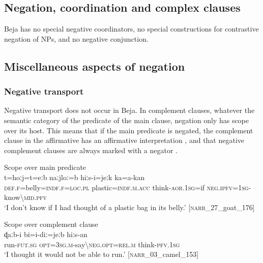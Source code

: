 \documentclass[output=paper,colorlinks,citecolor=brown]{langscibook}
\begin{document}

\subsection{Negation, coordination and complex clauses}
Beja has no special negative coordinators, no special constructions for contrastive negation of NPs, and no negative conjunction. 

\subsection{Miscellaneous aspects of negation}

\subsubsection{Negative transport}

Negative transport does not occur in Beja. In complement clauses, whatever the semantic category of the predicate of the main clause, negation only has scope over its host. This means that if the main predicate is negated, the complement clause in the affirmative has an affirmative interpretation , and that negative complement clauses are always marked with a negator .

\ea\label{ex:beja:42}
{Scope over main predicate}\\
    \gll t=hoːj=t=eːb naːjloː=b hiːs-i=jeːk ka=a-kan\\
         \textsc{def.f}=belly=\textsc{indf.f=loc.pl} plastic=\textsc{indf.m.acc} think-\textsc{aor.1sg}=if \textsc{neg.ipfv=1sg}-know{\textbackslash}\textsc{mid.pfv}\\
    \glt `I don’t know if I had thought of a plastic bag in its belly.' [\textsc{narr}\_27\_goat\_176]
\z

\ea\label{ex:beja:43}
{Scope over complement clause}\\
    \gll ɖaːb-i bi=i-diː=jeːb hiːs-an\\
         run-\textsc{fut.sg} \textsc{opt=3sg.m}-say{\textbackslash}\textsc{neg.opt=rel.m} think-\textsc{pfv.1sg}\\
    \glt `I thought it would not be able to run.' [\textsc{narr}\_03\_camel\_153]
\z
\end{document}
